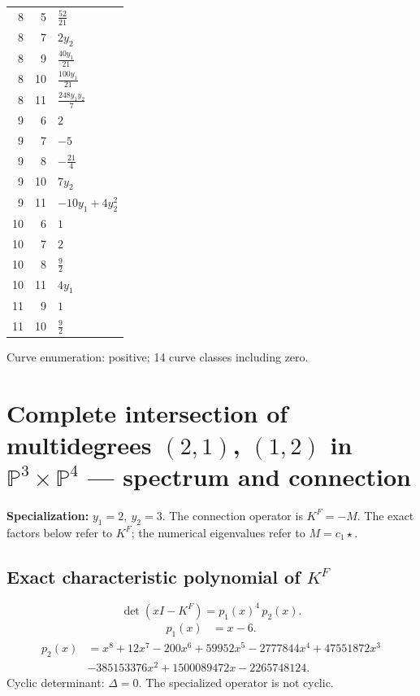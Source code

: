 \documentclass[10pt,a4paper]{article}
\begin{document}
{\begin{longtable}{rrp{125mm}}
8 & 5 & $\frac{52}{21}$\\
8 & 7 & $2 y_{2}$\\
8 & 9 & $\frac{40 y_{1}}{21}$\\
8 & 10 & $\frac{100 y_{1}}{21}$\\
8 & 11 & $\frac{248 y_{1} y_{2}}{7}$\\
9 & 6 & $2$\\
9 & 7 & $-5$\\
9 & 8 & $- \frac{21}{4}$\\
9 & 10 & $7 y_{2}$\\
9 & 11 & $- 10 y_{1} + 4 y_{2}^{2}$\\
10 & 6 & $1$\\
10 & 7 & $2$\\
10 & 8 & $\frac{9}{2}$\\
10 & 11 & $4 y_{1}$\\
11 & 9 & $1$\\
11 & 10 & $\frac{9}{2}$\\
\end{longtable}}
Curve enumeration: positive; 14 curve classes including zero.
\clearpage\section*{Complete intersection of multidegrees $(2,1)$, $(1,2)$ in $\mathbb P^{3}\times \mathbb P^{4}$ --- spectrum and connection}
\textbf{Specialization:} $y_1=2,\ y_2=3$. The connection operator is $K^F=-M$. The exact factors below refer to $K^F$; the numerical eigenvalues refer to $M=c_1\star$.
\subsection*{Exact characteristic polynomial of $K^F$}
\[\det(xI-K^F)=p_{1}(x)^{4}\,p_{2}(x).\]
\[\begin{aligned}p_{1}(x)&=x - 6.\end{aligned}\]
\[\begin{aligned}p_{2}(x)&=x^{8} + 12 x^{7} - 200 x^{6} + 59952 x^{5} - 2777844 x^{4} + 47551872 x^{3}\\&- 385153376 x^{2} + 1500089472 x - 2265748124.\end{aligned}\]
Cyclic determinant: $\Delta=0$. The specialized operator is not cyclic.
\end{document}
